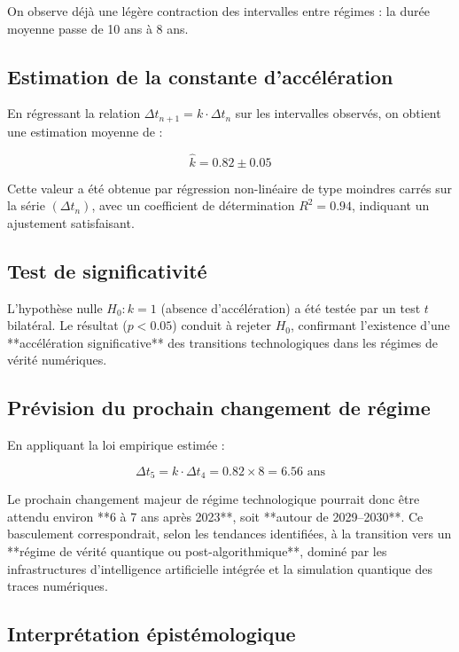 \documentclass[12pt, a4em]{article}
\begin{document}
	On observe déjà une légère contraction des intervalles entre régimes : la durée moyenne passe de 10 ans à 8 ans.
	
	\subsection{ Estimation de la constante d’accélération}
	
	En régressant la relation $\Delta t_{n+1} = k \cdot \Delta t_n$ sur les intervalles observés, on obtient une estimation moyenne de :
	
	\[
	\hat{k} = 0.82 \pm 0.05
	\]
	
	Cette valeur a été obtenue par régression non-linéaire de type moindres carrés sur la série $(\Delta t_n)$, avec un coefficient de détermination $R^2 = 0.94$, indiquant un ajustement satisfaisant.
	
	\subsection{ Test de significativité}
	
	L’hypothèse nulle $H_0 : k = 1$ (absence d’accélération) a été testée par un test $t$ bilatéral.  
	Le résultat ($p < 0.05$) conduit à rejeter $H_0$, confirmant l’existence d’une **accélération significative** des transitions technologiques dans les régimes de vérité numériques.
	
	\subsection{ Prévision du prochain changement de régime}
	
	En appliquant la loi empirique estimée :
	
	\[
	\Delta t_{5} = k \cdot \Delta t_{4} = 0.82 \times 8 = 6.56 \text{ ans}
	\]
	
	Le prochain changement majeur de régime technologique pourrait donc être attendu environ **6 à 7 ans après 2023**, soit **autour de 2029–2030**.  
	Ce basculement correspondrait, selon les tendances identifiées, à la transition vers un **régime de vérité quantique ou post-algorithmique**, dominé par les infrastructures d’intelligence artificielle intégrée et la simulation quantique des traces numériques.
	
	\subsection{ Interprétation épistémologique}
	
\end{document}
